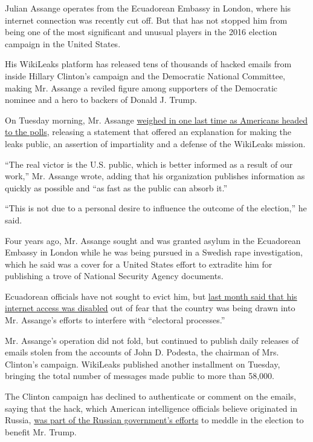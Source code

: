 Julian Assange operates from the Ecuadorean Embassy in London, where his
internet connection was recently cut off. But that has not stopped him
from being one of the most significant and unusual players in the 2016
election campaign in the United States.

His WikiLeaks platform has released tens of thousands of hacked emails
from inside Hillary Clinton's campaign and the Democratic National
Committee, making Mr. Assange a reviled figure among supporters of the
Democratic nominee and a hero to backers of Donald J. Trump.

On Tuesday morning, Mr. Assange
\href{https://wikileaks.org/Assange-Statement-on-the-US-Election.html}{weighed
in one last time as Americans headed to the polls}, releasing a
statement that offered an explanation for making the leaks public, an
assertion of impartiality and a defense of the WikiLeaks mission.

``The real victor is the U.S. public, which is better informed as a
result of our work,'' Mr. Assange wrote, adding that his organization
publishes information as quickly as possible and ``as fast as the public
can absorb it.''

``This is not due to a personal desire to influence the outcome of the
election,'' he said.

Four years ago, Mr. Assange sought and was granted asylum in the
Ecuadorean Embassy in London while he was being pursued in a Swedish
rape investigation, which he said was a cover for a United States effort
to extradite him for publishing a trove of National Security Agency
documents.

Ecuadorean officials have not sought to evict him, but
\href{http://www.nytimes.com/2016/10/19/world/europe/julian-assange-embassy.html}{last
month said that his internet access was disabled} out of fear that the
country was being drawn into Mr. Assange's efforts to interfere with
``electoral processes.''

Mr. Assange's operation did not fold, but continued to publish daily
releases of emails stolen from the accounts of John D. Podesta, the
chairman of Mrs. Clinton's campaign. WikiLeaks published another
installment on Tuesday, bringing the total number of messages made
public to more than 58,000.

The Clinton campaign has declined to authenticate or comment on the
emails, saying that the hack, which American intelligence officials
believe originated in Russia,
\href{http://www.nytimes.com/2016/09/01/world/europe/wikileaks-julian-assange-russia.html}{was
part of the Russian government's efforts} to meddle in the election to
benefit Mr. Trump.

